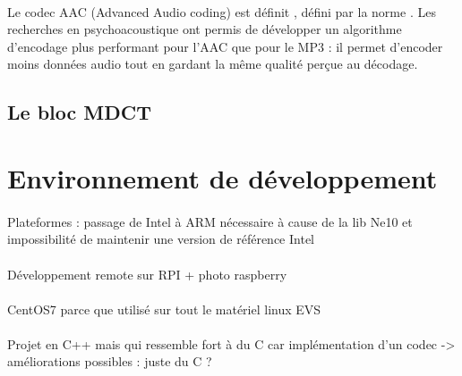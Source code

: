 \documentclass{article}
\begin{document}
    \paragraph{}
    Le codec AAC (Advanced Audio coding) est définit  , défini par la norme . Les recherches en psychoacoustique ont permis de développer un algorithme d'encodage plus performant pour l'AAC que pour le MP3 : il permet d'encoder moins données audio tout en gardant la même qualité perçue au décodage\cite{1999-Brandenburg}.



    \subsection{Le bloc MDCT}


    \newpage
    \section{Environnement de développement}
    \paragraph{}
    Plateformes : passage de Intel à ARM nécessaire à cause de la lib Ne10 et impossibilité de maintenir une version de référence Intel

    \paragraph{}
    Développement remote sur RPI + photo raspberry

    \paragraph{}
    CentOS7 parce que utilisé sur tout le matériel linux EVS

    \paragraph{}
    Projet en C++ mais qui ressemble fort à du C car implémentation d'un codec -> améliorations possibles : juste du C ?
\end{document}
